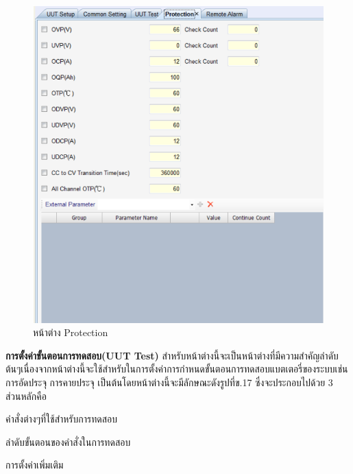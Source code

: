 \begin{center}
	\begin{figure}[H]
		\includegraphics[width=1\linewidth]{Chapters/img/17020_Program/Recipe_Editor/setting_protection.png}
		\centering
		\captionsetup{justification=centering,margin=2cm}
		\caption{หน้าต่าง Protection}
	\end{figure}
\end{center}
\textbf{การตั้งค่าขั้นตอนการทดสอบ(UUT Test)}
\newline \hspace*{2cm}
สำหรับหน้าต่างนี้จะเป็นหน้าต่างที่มีความสำคัญลำดับต้นๆเนื่องจากหน้าต่างนี้จะใช้สำหรับในการตั้งค่าการกำหนดขั้นตอนการทดสอบแบตเตอรี่ของระบบเช่น การอัดประจุ การคายประจุ เป็นต้นโดยหน้าต่างนี้จะมีลักษณะดังรูปที่ข.17
ซึ่งจะประกอบไปด้วย 3 ส่วนหลักคือ 
\begin{itemize}
{\item คำสั่งต่างๆที่ใช้สำหรับการทดสอบ}
{\item ลำดับขั้นตอนของคำสั่งในการทดสอบ}
{\item การตั้งค่าเพิ่มเติม}
\end{itemize}
